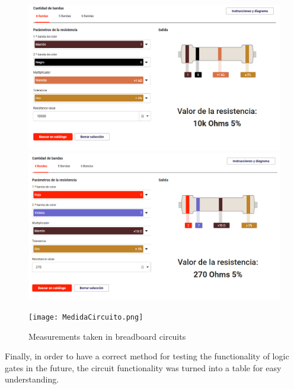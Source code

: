 \documentclass[12pt]{article}  %
\begin{document}
\begin{figure}[H]
  \centering
  \begin{minipage}{0.25\textwidth}
    \centering
    \includegraphics[width=\textwidth]{Resistencia1.png}
  \end{minipage}
  \hspace{0.05\textwidth}
  \begin{minipage}{0.25\textwidth}
    \centering
    \includegraphics[width=\textwidth]{Resistencia2.png}
  \end{minipage}
  \begin{minipage}{0.25\textwidth}
    \centering
    \texttt{[image: MedidaCircuito.png]}
  \end{minipage}
  \caption{Measurements taken in breadboard circuits}
  \label{fig:breadboard_measurement}
\end{figure}

Finally, in order to have a correct method for testing the functionality of logic gates in the future, the circuit functionality was turned into a table for easy understanding.
\end{document}
